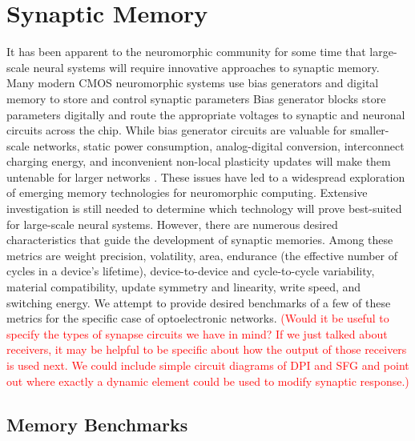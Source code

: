 \documentclass[twocolumn]{article}
\begin{document}
\section{\label{sec:memory}Synaptic Memory}
It has been apparent to the neuromorphic community for some time that large-scale neural systems will require innovative approaches to synaptic memory. Many modern CMOS neuromorphic systems use bias generators and digital memory to store and control synaptic parameters \cite{liu2014event} Bias generator blocks store parameters digitally and route the appropriate voltages to synaptic and neuronal circuits across the chip. While bias generator circuits are valuable for smaller-scale networks, static power consumption, analog-digital conversion, interconnect charging energy, and inconvenient non-local plasticity updates will make them untenable for larger networks \cite{dalgaty2019hybrid}. These issues have led to a widespread exploration of emerging memory technologies for neuromorphic computing. Extensive investigation is still needed to determine which technology will prove best-suited for large-scale neural systems. However, there are numerous desired characteristics that guide the development of synaptic memories. Among these metrics are weight precision, volatility, area, endurance (the effective number of cycles in a device's lifetime), device-to-device and cycle-to-cycle variability, material compatibility, update symmetry and linearity, write speed, and switching energy. We attempt to provide desired benchmarks of a few of these metrics for the specific case of optoelectronic networks. \textcolor{red}{(Would it be useful to specify the types of synapse circuits we have in mind? If we just talked about receivers, it may be helpful to be specific about how the output of those receivers is used next. We could include simple circuit diagrams of DPI and SFG and point out where exactly a dynamic element could be used to modify synaptic response.)}
\subsection{Memory Benchmarks}
\end{document}
